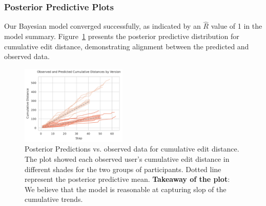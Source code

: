 \subsubsection{Posterior Predictive Plots}

Our Bayesian model converged successfully, as indicated by an $\hat{R}$ value of 1 in the model summary. Figure~\ref{fig:observed_and_predicted_cumulative_distances_by_version_m3} presents the posterior predictive distribution for cumulative edit distance, demonstrating alignment between the predicted and observed data.

\begin{figure}[h!]
    \centering
    \includegraphics[width=0.45\textwidth]{content/image/distance/observed_and_predicted_cumulative_distances_by_version_m3.pdf}
    \caption{Posterior Predictions vs. observed data for cumulative edit distance. The plot showed each observed user's cumulative edit distance in different shades for the two groups of participants. Dotted line represent the posterior predictive mean. \textbf{Takeaway of the plot}: We believe that the model is reasonable at capturing slop of the cumulative trends.}
    \label{fig:observed_and_predicted_cumulative_distances_by_version_m3}
\end{figure}
